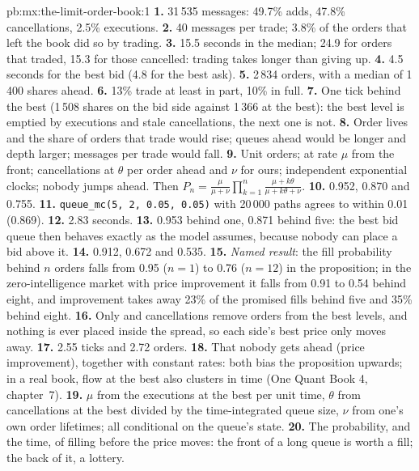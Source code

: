 \begin{solution}{pb:mx:the-limit-order-book:1}
\textbf{1.} 31\,535 messages: 49.7\% adds, 47.8\% cancellations, 2.5\% executions.
\textbf{2.} 40 messages per trade; 3.8\% of the orders that left the book did so by trading.
\textbf{3.} 15.5 seconds in the median; 24.9 for orders that traded, 15.3 for those cancelled: trading takes longer than giving up.
\textbf{4.} 4.5 seconds for the best bid (4.8 for the best ask).
\textbf{5.} 2\,834 orders, with a median of 1\,400 shares ahead.
\textbf{6.} 13\% trade at least in part, 10\% in full.
\textbf{7.} One tick behind the best (1\,508 shares on the bid side against 1\,366 at the best): the best level is emptied by executions and stale
cancellations, the next one is not.
\textbf{8.} Order lives and the share of orders that trade would rise; queues ahead would be longer and depth larger; messages per trade would fall.
\textbf{9.} Unit orders;  at rate $\mu$ from the front; cancellations at $\theta$ per order ahead and $\nu$ for ours; independent
exponential clocks; nobody jumps ahead. Then $P_n=\tfrac{\mu}{\mu+\nu}\prod_{k=1}^{n}\tfrac{\mu+k\theta}{\mu+k\theta+\nu}$.
\textbf{10.} 0.952, 0.870 and 0.755.
\textbf{11.} \texttt{queue\_mc(5, 2, 0.05, 0.05)} with 20\,000 paths agrees to within 0.01 (0.869).
\textbf{12.} 2.83 seconds.
\textbf{13.} 0.953 behind one, 0.871 behind five: the best bid queue then behaves exactly as the model assumes, because nobody can place a bid above
it.
\textbf{14.} 0.912, 0.672 and 0.535.
\textbf{15.} \emph{Named result}: the fill probability behind $n$ orders falls from 0.95 ($n=1$) to 0.76 ($n=12$) in the proposition; in the
zero-intelligence market with price improvement it falls from 0.91 to 0.54 behind eight, and improvement takes away 23\% of the promised fills behind
five and 35\% behind eight.
\textbf{16.} Only  and cancellations remove orders from the best levels, and nothing is ever placed inside the spread, so each side's
best price only moves away.
\textbf{17.} 2.55 ticks and 2.72 orders.
\textbf{18.} That nobody gets ahead (price improvement), together with constant rates: both bias the proposition upwards; in a real book, flow at the
best also clusters in time (One Quant Book 4, chapter~7).
\textbf{19.} $\mu$ from the executions at the best per unit time, $\theta$ from cancellations at the best divided by the time-integrated queue size,
$\nu$ from one's own order lifetimes; all conditional on the queue's state.
\textbf{20.} The probability, and the time, of filling before the price moves: the front of a long queue is worth a fill; the back of it, a lottery.
\end{solution}

